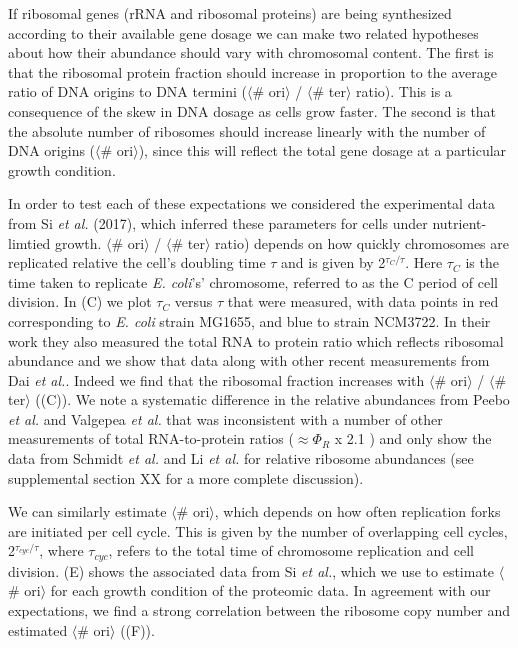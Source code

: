 If ribosomal genes (rRNA and ribosomal proteins) are being synthesized according
to their available gene dosage we can make two related hypotheses about how
their abundance should vary with chromosomal content. The first is that the
ribosomal protein fraction should increase in proportion  to the average ratio
of DNA origins to DNA termini ($\langle$\# ori$\rangle$ / $\langle$\#
ter$\rangle$ ratio). This is a consequence of the skew in DNA dosage as cells
grow faster. The second is that the absolute number of ribosomes should increase
linearly with the number of DNA origins ($\langle$\# ori$\rangle$), since
this will reflect the total gene dosage at a particular growth condition.

In order to test each of these expectations we considered the experimental data
from Si \textit{et al.} (2017), which inferred these parameters for cells under
nutrient-limtied growth. $\langle$\# ori$\rangle$ / $\langle$\# ter$\rangle$
ratio) depends on how quickly chromosomes are replicated relative the cell's
doubling time $\tau$ and is given by 2$^{\tau_C / \tau}$. Here $\tau_C$ is the
time taken to replicate \textit{E. coli}'s' chromosome, referred to as the C
period of cell division.  In (C) we plot $\tau_C$ versus
$\tau$ that were measured, with data points in red corresponding to \textit{E.
coli} strain MG1655, and blue to strain NCM3722. In their work they also
measured the total RNA to protein ratio  which reflects ribosomal abundance and
we show that data along with other recent  measurements from Dai \textit{et
al.}. Indeed we find that the ribosomal fraction increases with $\langle$\#
ori$\rangle$ / $\langle$\# ter$\rangle$ ((C)). We note a
systematic difference in the relative abundances from Peebo \textit{et al.} and
Valgepea \textit{et al.} that was inconsistent with a number of other
measurements of total RNA-to-protein ratios ($\approx \Phi_R$ x 2.1
\cite{dai2016}) and only show the data from Schmidt \textit{et al.} and Li
\textit{et al.} for relative ribosome abundances (see supplemental section XX
for a more complete discussion).

We can similarly estimate $\langle$\# ori$\rangle$, which depends on how often
replication forks are initiated per cell cycle. This is given by the number of
overlapping cell cycles,  2$^{\tau_{cyc} / \tau}$, where $\tau_{cyc}$, refers to
the total time of chromosome replication and cell division.
(E) shows the associated data from Si \textit{et al.},
which we use to estimate $\langle$\# ori$\rangle$  for each growth condition of
the proteomic data. In agreement with our expectations, we find a strong
correlation between the ribosome copy number and estimated $\langle$\#
ori$\rangle$ ((F)).

